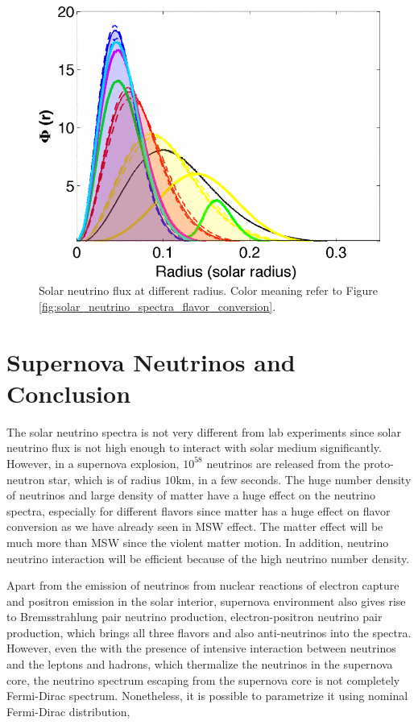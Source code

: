 \documentclass[%
 aip,
 jmp,%
 amsmath,amssymb,
 reprint,%
]{revtex4-1}
\begin{document}
\begin{figure}
\centering
\includegraphics[width=\columnwidth]{assets/solar_neutrino_production_radius.png}
\caption{Solar neutrino flux at different radius. Color meaning refer to Figure \ref{fig:solar_neutrino_spectra_flavor_conversion}.}
\label{fig:solar_neutrino_production_radius}
\end{figure}



\section{Supernova Neutrinos and Conclusion}


The solar neutrino spectra is not very different from lab experiments since solar neutrino flux is not high enough to interact with solar medium significantly. However, in a supernova explosion, $10^{58}$ neutrinos are released from the proto-neutron star, which is of radius $10\mathrm{km}$, in a few seconds. The huge number density of neutrinos and large density of matter have a huge effect on the neutrino spectra, especially for different flavors since matter has a huge effect on flavor conversion as we have already seen in MSW effect. The matter effect will be much more than MSW since the violent matter motion. In addition, neutrino neutrino interaction will be efficient because of the high neutrino number density.

Apart from the emission of neutrinos from nuclear reactions of electron capture and positron emission in the solar interior, supernova environment also gives rise to Bremsstrahlung pair neutrino production, electron-positron neutrino pair production, which brings all three flavors and also anti-neutrinos into the spectra. However, even the with the presence of intensive interaction between neutrinos and the leptons and hadrons, which thermalize the neutrinos in the supernova core, the neutrino spectrum escaping from the supernova core is not completely Fermi-Dirac spectrum. Nonetheless, it is possible to parametrize it using nominal Fermi-Dirac distribution,\cite{ysuzuki2004}
\end{document}
